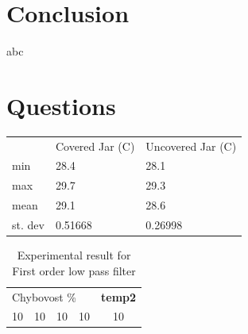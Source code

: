 \documentclass[a4paper, 12pt, english]{article}
\begin{document}
\section{Conclusion}
abc

\section{Questions}

\begin{table}[]
	\begin{tabular}{lll}
		        & Covered Jar (\degree C) & Uncovered Jar (\degree C) \\
		min     & 28.4            & 28.1              \\
		max     & 29.7            & 29.3              \\
		mean    & 29.1            & 28.6              \\
		st. dev & 0.51668         & 0.26998
	\end{tabular}
\end{table}
\begin{table}
	\caption[short]{\label{tab:Table 1} Experimental result for First order low pass filter}
	\centering
	\begin{tabular}{c c c c c}
		\toprule
		\multicolumn{4}{l|}{Chybovost \%} & \textbf{temp2}                \\
		\cmidrule[0.4pt](r{0.125em}){1-1}%
		\cmidrule[0.4pt](lr{0.125em}){2-2}%
		\cmidrule[0.4pt](lr{0.125em}){3-3}%
		\cmidrule[0.4pt](lr{0.125em}){4-4}%
		\cmidrule[0.4pt](lr{0.125em}){5-5}%
		10                                & 10             & 10 & 10 & 10

	\end{tabular}
\end{table}
\end{document}
